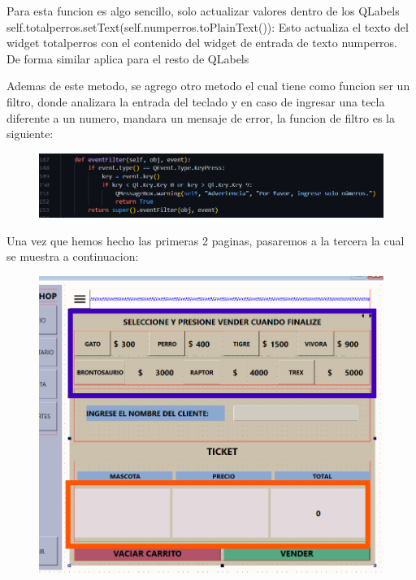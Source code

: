 \documentclass[11pt]{article}
\begin{document}
Para esta funcion es algo sencillo, solo actualizar valores dentro de los QLabels
 self.totalperros.setText(self.numperros.toPlainText()): Esto actualiza el texto del widget totalperros con el contenido del widget de entrada de texto numperros. \\
De forma similar aplica para el resto de QLabels

Ademas de este metodo, se agrego otro metodo el cual tiene como funcion ser un filtro, donde analizara la entrada del teclado y en caso de ingresar una tecla diferente a un numero, mandara un mensaje de error, la funcion de filtro es la siguiente: 
\begin{figure}[H]
		\begin{center}
 			\includegraphics[width = .7\textwidth]{10.png}
 			
		\end{center} 
\end{figure}

Una vez que hemos hecho las primeras 2 paginas, pasaremos a la tercera la cual se muestra a continuacion: 

\begin{figure}[H]
		\begin{center}
 			\includegraphics[width = .7\textwidth]{03.png}
 			
		\end{center} 
\end{figure}
\end{document}
